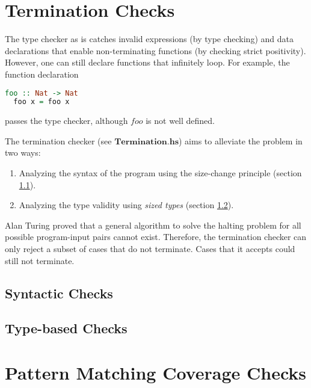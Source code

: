\documentclass[acmsmall]{acmart}
\numberwithin{figure}{subsection}
\begin{document}
\section{Termination Checks}
\label{sec:termination}

The type checker as is catches invalid expressions (by type checking) and data declarations that enable non-terminating functions (by checking strict positivity). However, one can still declare functions that infinitely loop. For example, the function declaration

\begin{lstlisting}[language=haskell]
  foo :: Nat -> Nat
  foo x = foo x
\end{lstlisting}

passes the type checker, although $foo$ is not well defined.

The termination checker (see $\boldsymbol{Termination.hs}$) aims to alleviate the problem in two ways:

\begin{enumerate}
  \item Analyzing the syntax of the program using the size-change principle (section \ref{sec:synTermination}).
  \item Analyzing the type validity using \emph{sized types} (section \ref{sec:typeTermination}).
\end{enumerate}

Alan Turing proved that a general algorithm to solve the halting problem for all possible program-input pairs cannot exist. Therefore, the termination checker can only reject a subset of cases that do not terminate. Cases that it accepts could still not terminate.

\subsection{Syntactic Checks}
\label{sec:synTermination}



\subsection{Type-based Checks}
\label{sec:typeTermination}

\section{Pattern Matching Coverage Checks}
\label{sec:pattern}
\end{document}
